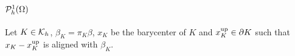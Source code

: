 %
\subsection{$\mathcal{P}^1_h(\Omega)$}\label{subsec:}
%
\newcommand{\xKup}{x_K^{\rm up}}
%
Let $K\in\mathcal K_h$, $\beta_K=\pi_K\beta$, $x_K$ be the barycenter of $K$ and $\xKup\in\partial K$ such that 
$x_K - \xKup$ is aligned with $\beta_K$.

\printbibliography[title=References Section~\thesection]

